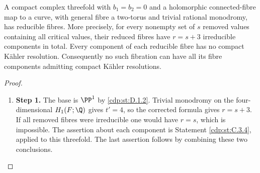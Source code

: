 \begin{proposition}\hypertarget{tag-01G8}{}\label{cdp:st:D.2.1}

A compact complex threefold with $b_1=b_2=0$ and a holomorphic
connected-fibre map to a curve, with general fibre a two-torus and
trivial rational monodromy, has reducible fibres. More precisely,
for every nonempty set of $s$ removed values containing all critical
values, their reduced fibres have $r=s+3$ irreducible components in
total. Every component of each reducible fibre has no compact
K\"ahler resolution. Consequently no such fibration can have all
its fibre components admitting compact K\"ahler resolutions.
\end{proposition}


\begin{proof}
\begin{enumerate}[label={$\langle1\rangle$\arabic*.},leftmargin=*]
\item 
\noindent\textbf{Step 1.} The base is $\PP^1$ by \ref{cdp:st:D.1.2}. Trivial monodromy on the
four-dimensional $H_1(F;\Q)$ gives $t'=4$, so the corrected formula
gives $r=s+3$. If all removed fibres were irreducible one would have
$r=s$, which is impossible. The assertion about each component is
Statement \ref{cdp:st:C.3.4}, applied to this threefold. The last assertion follows
by combining these two conclusions.

\end{enumerate}
\end{proof}